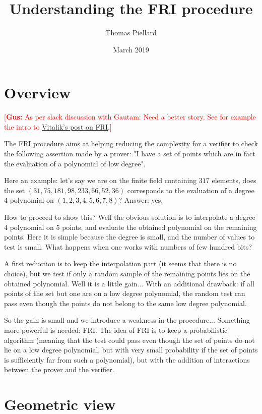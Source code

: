 \documentclass[12pt]{extarticle}
\title{Understanding the FRI procedure}
\author{Thomas Piellard}
\date{March 2019}
\newcommand{\<}{\langle}
\renewcommand{\>}{\rangle}
\theoremstyle{definition}
\newcommand{\gus}[1]{\textcolor{red}{[\textbf{Gus:} #1]}}
\begin{document}
\maketitle

\section{Overview}

\gus{As per slack discussion with Gautam: Need a better story.  See for example the intro to \href{https://vitalik.ca/general/2017/11/22/starks_part_2.html}{Vitalik's post on FRI}.}

The FRI procedure aims at helping reducing the complexity for a verifier to check the following assertion made by a prover: "I have a set of points which are in fact the evaluation of a polynomial of low degree".

Here an example: let's say we are on the finite field containing $317$ elements, does the set $(31,75,181,98,233,66,52,36)$ corresponds to the evaluation of a degree $4$ polynomial on $(1,2,3,4,5,6,7,8)$? Answer: yes.

How to proceed to show this? Well the obvious solution is to interpolate a degree $4$ polynomial on $5$ points, and evaluate the obtained polynomial on the remaining points. Here it is simple because the degree is small, and the number of values to test is small. What happens when one works with numbers of few hundred bits?

A first reduction is to keep the interpolation part (it seems that there is no choice), but we test if only a random sample of the remaining points lies on the obtained polynomial. Well it is a little gain... With an additional drawback: if all points of the set but one are on a low degree polynomial, the random test can pass even though the points do not belong to the same low degree polynomial.

So the gain is small and we introduce a weakness in the procedure... Something more powerful is needed: FRI. The idea of FRI is to keep a probabilistic algorithm (meaning that the test could pass even though the set of points do not lie on a low degree polynomial, but with very small probability if the set of points is sufficiently far from such a polynomial), but with the addition of interactions between the prover and the verifier.

\section{Geometric view}
\end{document}
